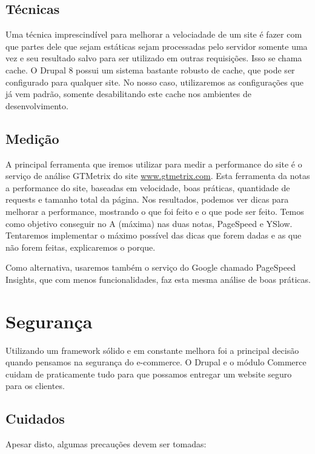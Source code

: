 \subsection{Técnicas}
Uma técnica imprescindível para melhorar a velociadade de um site é fazer com que partes dele que sejam estáticas sejam processadas pelo servidor somente uma vez e seu resultado salvo para ser utilizado em outras requisições. Isso se chama cache. O Drupal 8 possui um sistema bastante robusto de cache, que pode ser configurado para qualquer site. No nosso caso, utilizaremos as configurações que já vem padrão, somente desabilitando este cache nos ambientes de desenvolvimento.

\subsection{Medição}
A principal ferramenta que iremos utilizar para medir a performance do site é o serviço de análise GTMetrix do site \url{www.gtmetrix.com}. Esta ferramenta da notas a performance do site, baseadas em velocidade, boas práticas, quantidade de requests e tamanho total da página. Nos resultados, podemos ver dicas para melhorar a performance, mostrando o que foi feito e o que pode ser feito. Temos como objetivo conseguir no A (máxima) nas duas notas, PageSpeed e YSlow. Tentaremos implementar o máximo possível das dicas que forem dadas e as que não forem feitas, explicaremos o porque.

Como alternativa, usaremos também o serviço do Google chamado PageSpeed Insights, que com menos funcionalidades, faz esta mesma análise de boas práticas.


\section{Segurança}

Utilizando um framework sólido e em constante melhora foi a principal decisão quando pensamos na segurança do e-commerce. O Drupal e o módulo Commerce cuidam de praticamente tudo para que possamos entregar um website seguro para os clientes.

\subsection{Cuidados}
Apesar disto, algumas precauções devem ser tomadas:

